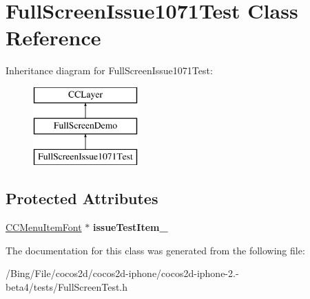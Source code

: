 \hypertarget{interface_full_screen_issue1071_test}{\section{Full\-Screen\-Issue1071\-Test Class Reference}
\label{interface_full_screen_issue1071_test}
}
Inheritance diagram for Full\-Screen\-Issue1071\-Test\-:\begin{figure}[H]
\begin{center}
\leavevmode
\includegraphics[height=3.000000cm]{interface_full_screen_issue1071_test}
\end{center}
\end{figure}
\subsection*{Protected Attributes}
\begin{DoxyCompactItemize}
\item 
\hypertarget{interface_full_screen_issue1071_test_a4cdcfe0e2a0070cdf8bf2fcbd4210337}{\hyperlink{class_c_c_menu_item_font}{C\-C\-Menu\-Item\-Font} $\ast$ {\bfseries issue\-Test\-Item\-\_\-}}\label{interface_full_screen_issue1071_test_a4cdcfe0e2a0070cdf8bf2fcbd4210337}

\end{DoxyCompactItemize}


The documentation for this class was generated from the following file\-:\begin{DoxyCompactItemize}
\item 
/\-Bing/\-File/cocos2d/cocos2d-\/iphone/cocos2d-\/iphone-\/2.-\/beta4/tests/Full\-Screen\-Test.\-h\end{DoxyCompactItemize}
